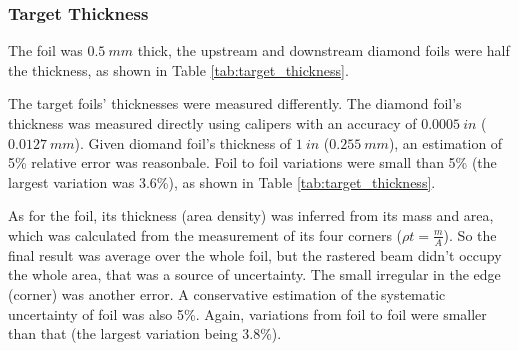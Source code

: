 \subsubsection{Target Thickness}
The \Pb foil was $0.5\ mm$ thick, the upstream and downstream diamond foils 
were half the \Pb thickness, as shown in Table \ref{tab:target_thickness}.

The target foils' thicknesses were measured differently. The diamond foil's 
thickness was measured directly using calipers with an accuracy of $0.0005 \ in$ ($0.0127 \ mm$).
Given diomand foil's thickness of $1\ in$ ($0.255 \ mm$), an estimation of 5\% 
relative error was reasonbale. Foil to foil variations were small than 5\% (the
largest variation was 3.6\%), as shown in Table \ref{tab:target_thickness}.

As for the \Pb foil, its thickness (area density) was inferred from its mass 
and area, which was calculated from the measurement of its four corners ($\rho t = \frac{m}{A}$). 
So the final result was average over the whole foil, but the rastered beam 
didn't occupy the whole area, that was a source of uncertainty. The small irregular
in the edge (corner) was another error. A conservative estimation of the systematic
uncertainty of \Pb foil was also 5\%. Again, variations from foil to foil were 
smaller than that (the largest variation being 3.8\%).

